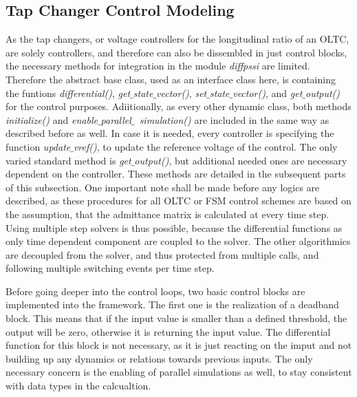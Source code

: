 \subsection{Tap Changer Control Modeling}
\label{sec:modeling-tap-changer-control}

As the tap changers, or voltage controllers for the longitudinal ratio of an \acs{OLTC}, are solely controllers, and therefore can also be dissembled in just control blocks, the necessary methods for integration in the module \textit{diffpssi} are limited.
Therefore the abstract base class, used as an interface class here, is containing the funtions \textit{differential()}, \textit{get$\_$state$\_$vector()}, \textit{set$\_$state$\_$vector()}, and \textit{get$\_$output()} for the control purposes.
Adiitionally, as every other dynamic class, both methods \textit{initialize()} and \textit{enable$\_$parallel$\_$\ simulation()} are included in the same way as described before as well.
In case it is needed, every controller is specifying the function \textit{update$\_$vref()}, to update the reference voltage of the control. 
The only varied standard method is \textit{get$\_$output()}, but additional needed ones are necessary dependent on the controller.
These methods are detailed in the subsequent parts of this subsection.
One important note shall be made before any logics are described, as these procedures for all \acs{OLTC} or \acs{FSM} control schemes are based on the assumption, that the admittance matrix is calculated at every time step.
Using multiple step solvers is thus possible, because the differential functions as only time dependent component are coupled to the solver.
The other algorithmics are decoupled from the solver, and thus protected from multiple calls, and following multiple switching events per time step.

Before going deeper into the control loops, two basic control blocks are implemented into the framework.
The first one is the realization of a deadband block.
This means that if the input value is smaller than a defined threshold, the output will be zero, otherwise it is returning the input value.
The differential function for this block is not necessary, as it is just reacting on the imput and not building up any dynamics or relations towards previous inputs.
The only necessary concern is the enabling of parallel simulations as well, to stay consistent with data types in the calcualtion.

